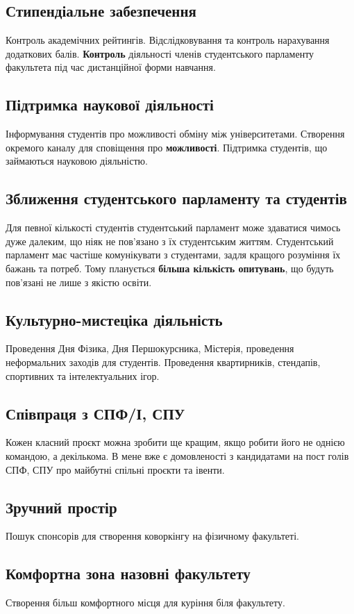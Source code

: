 \documentclass[a4paper,12pt]{article}
\begin{document}
\subsection{Стипендіальне забезпечення}
Контроль академічних рейтингів. Відслідковування та контроль нарахування додаткових балів. \textbf{Контроль} діяльності членів студентського парламенту факультета під час дистанційної форми навчання.
\subsection{Підтримка наукової діяльності}
Інформування студентів про можливості обміну між університетами. Створення окремого каналу для сповіщення про \textbf{можливості}. Підтримка студентів, що займаються науковою діяльністю.
\newpage
\subsection{Зближення студентського парламенту та студентів}
Для певної кількості студентів студентський парламент може здаватися чимось дуже далеким, що ніяк не пов'язано з їх студентським життям. Студентський парламент має частіше комунікувати з студентами, задля кращого розуміння їх бажань та потреб. Тому планується \textbf{більша кількість опитувань}, що будуть пов'язані не лише з якістю освіти.
\subsection{Культурно-мистеціка діяльність}
Проведення Дня Фізика, Дня Першокурсника, Містерія, проведення неформальних заходів для студентів. Проведення квартирників, стендапів, спортивних та  інтелектуальних ігор.
\subsection{Співпраця з СПФ/І, СПУ}
Кожен класний проєкт можна зробити ще кращим, якщо робити його не однією командою, а декількома. В мене вже є домовленості з кандидатами на пост голів СПФ, СПУ про майбутні спільні проєкти та івенти.
\subsection{Зручний простір}
Пошук спонсорів для створення коворкінгу на фізичному факультеті.
\subsection{Комфортна зона назовні факультету}
Створення більш комфортного місця для куріння біля факультету.
\end{document}
